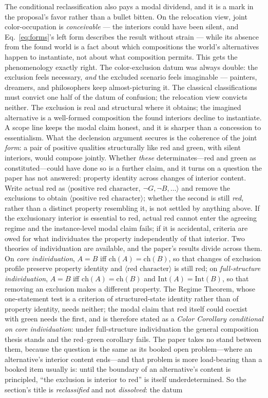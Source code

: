 \documentclass[11pt]{article}
\begin{document}
The conditional reclassification also pays a modal dividend, and it is a mark in the proposal's favor rather than a bullet bitten. On the relocation view, joint color-occupation is \emph{conceivable} --- the interiors could have been silent, and Eq.~\eqref{eq:forms}'s left form describes the result without strain --- while its absence from the found world is a fact about which compositions the world's alternatives happen to instantiate, not about what composition permits. This gets the phenomenology exactly right. The color-exclusion datum was always double: the exclusion feels necessary, \emph{and} the excluded scenario feels imaginable --- painters, dreamers, and philosophers keep almost-picturing it. The classical classifications must convict one half of the datum of confusion; the relocation view convicts neither. The exclusion is real and structural where it obtains; the imagined alternative is a well-formed composition the found interiors decline to instantiate. A scope line keeps the modal claim honest, and it is sharper than a concession to essentialism. What the declension argument secures is the coherence of the joint \emph{form}: a pair of positive qualities structurally like red and green, with silent interiors, would compose jointly. Whether \emph{these} determinates---red and green as constituted---could have done so is a further claim, and it turns on a question the paper has not answered: property identity across changes of interior content. Write actual red as $\langle \text{positive red character},\ \neg G, \neg B, \ldots \rangle$ and remove the exclusions to obtain $\langle \text{positive red character} \rangle$; whether the second is still \emph{red}, rather than a distinct property resembling it, is not settled by anything above. If the exclusionary interior is essential to red, actual red cannot enter the agreeing regime and the instance-level modal claim fails; if it is accidental, criteria are owed for what individuates the property independently of that interior. Two theories of individuation are available, and the paper's results divide across them. On \emph{core individuation}, $A = B$ iff $\mathrm{ch}(A) = \mathrm{ch}(B)$, so that changes of exclusion profile preserve property identity and $\langle \text{red character} \rangle$ is still red; on \emph{full-structure individuation}, $A = B$ iff $\mathrm{ch}(A) = \mathrm{ch}(B)$ and $\mathrm{Int}(A) = \mathrm{Int}(B)$, so that removing an exclusion makes a different property. The Regime Theorem, whose one-statement test is a criterion of structured-state identity rather than of property identity, needs neither; the modal claim that red itself could coexist with green needs the first, and is therefore stated as a \emph{Color Corollary conditional on core individuation}: under full-structure individuation the general composition thesis stands and the red--green corollary fails. The paper takes no stand between them, because the question is the same as its booked open problem---where an alternative's interior content ends---and that problem is more load-bearing than a booked item usually is: until the boundary of an alternative's content is principled, ``the exclusion is interior to red'' is itself underdetermined. So the section's title is \emph{reclassified} and not \emph{dissolved}: the datum 
\end{document}

